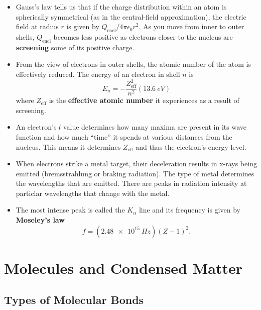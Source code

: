 \documentclass{article}
\begin{document}
\begin{itemize}
  \item Gauss's law tells us that if the charge distribution within an atom is spherically symmetrical (as in the central-field approximation), the electric field at radius $r$ is given by $Q_\text{encl} / 4 \pi \epsilon_0 r^2$. As you move from inner to outer shells, $Q_\text{encl}$ becomes less positive as electrons closer to the nucleus are \textbf{screening} some of its positive charge.

  \item From the view of electrons in outer shells, the atomic number of the atom is effectively reduced. The energy of an electron in shell $n$ is \[E_n = -\frac{Z_\text{eff}^2}{n^2} (\qty{13.6}{eV})\] where $Z_\text{eff}$ is the \textbf{effective atomic number} it experiences as a result of screening.

  \item An electron's $l$ value determines how many maxima are present in its wave function and how much ``time'' it spends at various distances from the nucleus. This means it determines $Z_\text{eff}$ and thus the electron's energy level.

  \item When electrons strike a metal target, their deceleration results in x-rays being emitted (bremsstrahlung or braking radiation). The type of metal determines the wavelengths that are emitted. There are peaks in radiation intensity at particlar wavelengths that change with the metal.

  \item The most intense peak is called the $K_\alpha$ line and its frequency is given by \textbf{Moseley's law} \[f = (\qty{2.48e15}{Hz}) (Z - 1)^2.\]
\end{itemize}

\section{Molecules and Condensed Matter}

\subsection{Types of Molecular Bonds}
\end{document}

